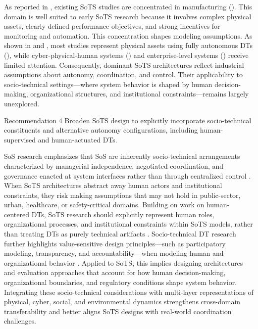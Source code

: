 As reported in , existing SoTS studies are concentrated in manufacturing (). This domain is well suited to early SoTS research because it involves complex physical assets, clearly defined performance objectives, and strong incentives for monitoring and automation. This concentration shapes modeling assumptions. As shown in  and , most studies represent physical assets using fully autonomous DTs (), while cyber-physical-human systems () and enterprise-level systems () receive limited attention. Consequently, dominant SoTS architectures reflect industrial assumptions about autonomy, coordination, and control. Their applicability to socio-technical settings---where system behavior is shaped by human decision-making, organizational structures, and institutional constraints---remains largely unexplored.

\begin{recoframe}{Recommendation 4}
Broaden SoTS design to explicitly incorporate socio-technical constituents and alternative autonomy configurations, including human-supervised and human-actuated DTs.
\end{recoframe}

SoS research emphasizes that SoS are inherently socio-technical arrangements characterized by managerial independence, negotiated coordination, and governance enacted at system interfaces rather than through centralized control \cite{siemieniuch2014extending}. When SoTS architectures abstract away human actors and institutional constraints, they risk making assumptions that may not hold in public-sector, urban, healthcare, or safety-critical domains. Building on work on human-centered DTs, SoTS research should explicitly represent human roles, organizational processes, and institutional constraints within SoTS models, rather than treating DTs as purely technical artifacts \cite{ye2023developing}. Socio-technical DT research further highlights value-sensitive design principles---such as participatory modeling, transparency, and accountability---when modeling human and organizational behavior \cite{barn2022sociotechnical}. Applied to SoTS, this implies designing architectures and evaluation approaches that account for how human decision-making, organizational boundaries, and regulatory conditions shape system behavior. Integrating these socio-technical considerations with multi-layer representations of physical, cyber, social, and environmental dynamics strengthens cross-domain transferability and better aligns SoTS designs with real-world coordination challenges.



